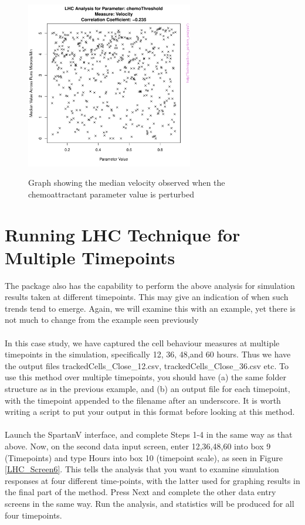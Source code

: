 \documentclass[a4paper,11pt]{article}
\begin{document}
\begin{figure}[h!]
\centering
    \includegraphics[width=0.65\textwidth]{LHC_chemoThreshold_Velocity.pdf}\\ \noindent
    \caption{Graph showing the median velocity observed when the chemoattractant parameter value is perturbed}
    \label{LHC_Results2}
\end{figure}


\section{Running LHC Technique for Multiple Timepoints}
\noindent The package also has the capability to perform the above analysis for simulation results taken at different timepoints. This may give an indication of when such trends tend to emerge.  Again, we will examine this with an example, yet there is not much to change from the example seen previously\\
\\
In this case study, we have captured the cell behaviour measures at multiple timepoints in the simulation, specifically 12, 36, 48,and 60 hours.  Thus we have the output files trackedCells\_Close\_12.csv, trackedCells\_Close\_36.csv etc. To use this method over multiple timepoints, you should have (a) the same folder structure as in the previous example, and (b) an output file for each timepoint, with the timepoint appended to the filename after an underscore. It is worth writing a script to put your output in this format before looking at this method.\\
\\
Launch the SpartanV interface, and complete Steps 1-4 in the same way as that above. Now, on the second data input screen, enter 12,36,48,60 into box 9 (Timepoints) and type Hours into box 10 (timepoint scale), as seen in Figure \ref{LHC_Screen6}. This tells the analysis that you want to examine simulation responses at four different time-points, with the latter used for graphing results in the final part of the method. Press Next and complete the other data entry screens in the same way. Run the analysis, and statistics will be produced for all four timepoints. 
\end{document}
